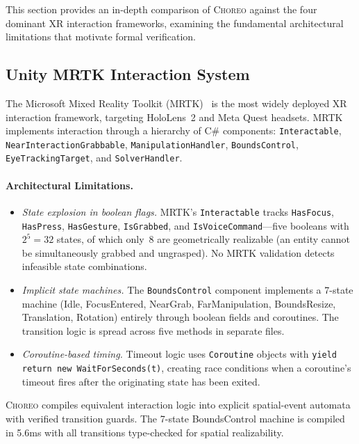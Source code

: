 \documentclass[11pt,a4paper]{article}
\begin{document}
This section provides an in-depth comparison of \textsc{Choreo} against the four
dominant XR interaction frameworks, examining the fundamental architectural
limitations that motivate formal verification.

\subsection{Unity MRTK Interaction System}

The Microsoft Mixed Reality Toolkit (MRTK)~\cite{mrtk2023} is the most widely
deployed XR interaction framework, targeting HoloLens~2 and Meta Quest headsets.
MRTK implements interaction through a hierarchy of C\# components:
\texttt{Interactable}, \texttt{NearInteractionGrabbable},
\texttt{ManipulationHandler}, \texttt{BoundsControl},
\texttt{EyeTrackingTarget}, and \texttt{SolverHandler}.

\paragraph{Architectural Limitations.}
\begin{itemize}
\item \emph{State explosion in boolean flags.}
  MRTK's \texttt{Interactable} tracks \texttt{HasFocus}, \texttt{HasPress},
  \texttt{HasGesture}, \texttt{IsGrabbed}, and \texttt{IsVoiceCommand}---five
  booleans with $2^5{=}32$ states, of which only~8 are geometrically realizable
  (an entity cannot be simultaneously grabbed and ungrasped).
  No MRTK validation detects infeasible state combinations.
\item \emph{Implicit state machines.}
  The \texttt{BoundsControl} component implements a 7-state machine
  (Idle, FocusEntered, NearGrab, FarManipulation, BoundsResize, Translation,
  Rotation) entirely through boolean fields and coroutines.
  The transition logic is spread across five methods in separate files.
\item \emph{Coroutine-based timing.}
  Timeout logic uses \texttt{Coroutine} objects with \texttt{yield return new
  WaitForSeconds(t)}, creating race conditions when a coroutine's timeout fires
  after the originating state has been exited.
\end{itemize}

\textsc{Choreo} compiles equivalent interaction logic into explicit spatial-event
automata with verified transition guards.
The 7-state BoundsControl machine is compiled in 5.6ms with all transitions
type-checked for spatial realizability.
\end{document}
